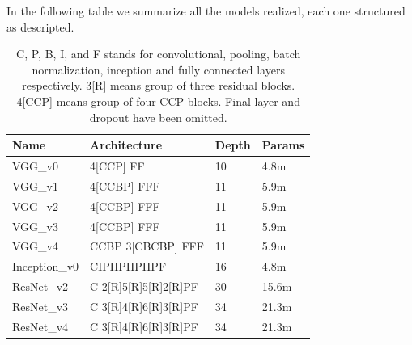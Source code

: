 \documentclass[10pt,twocolumn,letterpaper]{article}
\begin{document}
\noindent In the following table we summarize all the models realized, each one structured as descripted.
\def\arraystretch{1.2}
\begin{table}[H]
   \begin{tabular}{L{1.2cm}R{3.5cm}C{0.6cm}C{1.4cm}}
      \hline
      Name          & Architecture         & Depth & Params \\ %
      \hline\hline
      VGG\_v0       & 4[CCP] FF            & 10    & 4.8m   \\%
      VGG\_v1       & 4[CCBP] FFF          & 11    & 5.9m   \\ %
      VGG\_v2       & 4[CCBP] FFF          & 11    & 5.9m   \\%
      VGG\_v3       & 4[CCBP] FFF          & 11    & 5.9m   \\%
      VGG\_v4       & CCBP 3[CBCBP] FFF    & 11    & 5.9m   \\%
      Inception\_v0 & CIPIIPIIPIIPF        & 16    & 4.8m   \\%
      ResNet\_v2    & C 2[R]5[R]5[R]2[R]PF & 30    & 15.6m  \\%
      ResNet\_v3    & C 3[R]4[R]6[R]3[R]PF & 34    & 21.3m  \\%
      ResNet\_v4    & C 3[R]4[R]6[R]3[R]PF & 34    & 21.3m  \\%
      \hline
   \end{tabular}
   \caption{C, P, B, I, and F stands for convolutional, pooling, batch normalization,
      inception and fully connected layers respectively. 3[R] means group of three residual blocks.
      4[CCP] means group of four CCP blocks.
      Final layer and dropout have been omitted.}
   \label{mytable}
\end{table}
\end{document}
